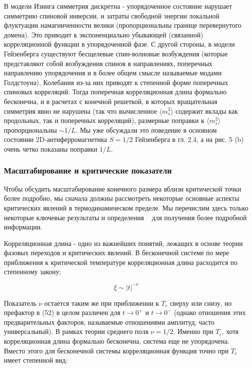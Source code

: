 \documentclass[11pt]{article}
\begin{document}
В модели Изинга симметрия дискретна - упорядоченное состояние нарушает симметрию спиновой инверсии, и затраты свободной энергии локальной флуктуации намагниченности велики (пропорциональны границе перевернутого домена). Это приводит к экспоненциально убывающей (связанной) корреляционной функции в упорядоченной фазе. С другой стороны, в модели Гейзенберга существуют бесщелевые спин-волновые возбуждения (которые представляют собой возбуждения спинов в направлениях, поперечных направлению упорядочения и в более общем смысле называемые модами Голдстоуна). Колебания из-за них приводят к степенной форме поперечных спиновых корреляций. Тогда поперечная корреляционная длина формально бесконечна, и в расчетах с конечной решеткой, в которых вращательная симметрия явно не нарушена (так что вычисленное $\langle m_s^2 \rangle$ содержит вклады как продольных, так и поперечных корреляций), размерные поправки к $\langle m_s^2 \rangle$ пропорциональны $ \sim 1/L$. Мы уже обсуждали это поведение в основном состоянии 2D-антиферромагнетика $S = 1/2$ Гейзенберга в гл. 2.4, а на рис. 5 (b) очень четко показаны поправки $1/L$.

\subsubsection{Масштабирование и критические показатели}
Чтобы обсудить масштабирование конечного размера вблизи критической точки более подробно, мы сначала должны рассмотреть некоторые основные аспекты критических явлений в термодинамическом пределе. Мы перечислим здесь только некоторые ключевые результаты и определения ~\cite{cardy} для получения более подробной информации.

Корреляционная длина - одно из важнейших понятий, лежащих в основе теории фазовых переходов и критических явлений. В бесконечной системе по мере приближения к критической температуре корреляционная длина расходится по степенному закону;

\begin{equation}
\xi \sim |t|^{-\nu}
\label{eq_52}
\end{equation}

Показатель $\nu$ остается таким же при приближении к $T_c$ сверху или снизу, но префактор в (52) в целом различен для $t → 0^{+}$ и $t → 0^{-}$ (однако отношения этих предварительных факторов, называемые отношениями амплитуд, часто универсальный). В рамках теории среднего поля $\nu = 1/2$. Именно при $T_c$, хотя корреляционная длина формально бесконечна, система еще не упорядочена. Вместо этого для бесконечной системы корреляционная функция точно при $T_c$ имеет степенной вид:
\end{document}
